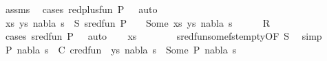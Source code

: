 \begin{isabellebody}
\ assms\ \isamarkupfalse%
\ {\isacharparenleft}{\kern0pt}cases\ {\isachardoublequoteopen}red{\isacharunderscore}{\kern0pt}plus{\isacharunderscore}{\kern0pt}fun\ {\isacharparenleft}{\kern0pt}P{\isacharcomma}{\kern0pt}\ {\isacharbraceleft}{\kern0pt}{\isacharbraceright}{\kern0pt}{\isacharcomma}{\kern0pt}\ {\isacharbrackleft}{\kern0pt}{\isacharbrackright}{\kern0pt}{\isacharparenright}{\kern0pt}{\isachardoublequoteclose}{\isacharparenright}{\kern0pt}\ auto\isanewline
\ \ \isamarkupfalse%
\ xs\ ys\ nabla{}\ s{}\ \ S{\isacharcolon}{\kern0pt}\ {\isachardoublequoteopen}sred{\isacharunderscore}{\kern0pt}fun\ {\isacharparenleft}{\kern0pt}P{\isacharcomma}{\kern0pt}\ {\isacharbraceleft}{\kern0pt}{\isacharbraceright}{\kern0pt}{\isacharcomma}{\kern0pt}\ {\isacharbrackleft}{\kern0pt}{\isacharbrackright}{\kern0pt}{\isacharparenright}{\kern0pt}\ {\isacharequal}{\kern0pt}\ Some\ {\isacharparenleft}{\kern0pt}{\isacharparenleft}{\kern0pt}xs{\isacharcomma}{\kern0pt}\ ys{\isacharparenright}{\kern0pt}{\isacharcomma}{\kern0pt}\ nabla{}{\isacharcomma}{\kern0pt}\ s{}{\isacharparenright}{\kern0pt}{\isachardoublequoteclose}\isanewline
\ \ \ \ \isamarkupfalse%
\ R\ \isamarkupfalse%
\ {\isacharparenleft}{\kern0pt}cases\ {\isachardoublequoteopen}sred{\isacharunderscore}{\kern0pt}fun\ {\isacharparenleft}{\kern0pt}P{\isacharcomma}{\kern0pt}\ {\isacharbraceleft}{\kern0pt}{\isacharbraceright}{\kern0pt}{\isacharcomma}{\kern0pt}\ {\isacharbrackleft}{\kern0pt}{\isacharbrackright}{\kern0pt}{\isacharparenright}{\kern0pt}{\isachardoublequoteclose}{\isacharparenright}{\kern0pt}\ auto\isanewline
\ \ \isamarkupfalse%
\ {\isachardoublequoteopen}xs\ {\isacharequal}{\kern0pt}\ {\isacharbrackleft}{\kern0pt}{\isacharbrackright}{\kern0pt}{\isachardoublequoteclose}\isanewline
\ \ \ \ \isamarkupfalse%
\ sred{\isacharunderscore}{\kern0pt}fun{\isacharunderscore}{\kern0pt}some{\isacharunderscore}{\kern0pt}fst{\isacharunderscore}{\kern0pt}empty{\isacharbrackleft}{\kern0pt}OF\ S{\isacharbrackright}{\kern0pt}\ \isamarkupfalse%
\ simp\isanewline
\ \ \isamarkupfalse%
\ P{}\ nabla{}\ s{}\ \ C{\isacharcolon}{\kern0pt}\ {\isachardoublequoteopen}cred{\isacharunderscore}{\kern0pt}fun\ {\isacharparenleft}{\kern0pt}{\isacharparenleft}{\kern0pt}{\isacharbrackleft}{\kern0pt}{\isacharbrackright}{\kern0pt}{\isacharcomma}{\kern0pt}\ ys{\isacharparenright}{\kern0pt}{\isacharcomma}{\kern0pt}\ nabla{}{\isacharcomma}{\kern0pt}\ s{}{\isacharparenright}{\kern0pt}\ {\isacharequal}{\kern0pt}\ Some\ {\isacharparenleft}{\kern0pt}P{}{\isacharcomma}{\kern0pt}\ nabla{}{\isacharcomma}{\kern0pt}\ s{}{\isacharparenright}{\kern0pt}{\isachardoublequoteclose}\isanewline

\end{isabellebody}
